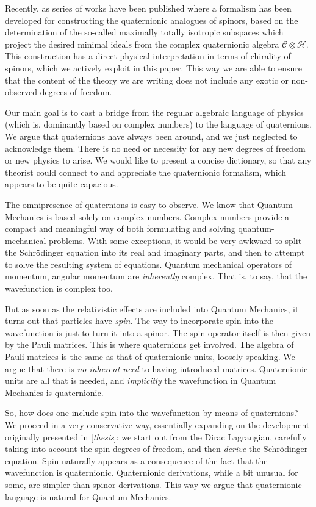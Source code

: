 \documentclass[epsfig,12pt]{article}
\newcommand{\cC}{\mathcal{C}}
\newcommand{\cH}{\mathcal{H}}
\begin{document}
	Recently, as series of works have been published where a formalism has been developed for constructing
	the quaternionic analogues of spinors, based on the determination of the so-called
	maximally totally isotropic subspaces which project the desired minimal ideals from the
	complex quaternionic algebra $ \cC \otimes \cH $.
	This construction has a direct physical interpretation in terms of chirality of spinors,
	which we actively exploit in this paper.
	This way we are able to ensure that the content of the theory we are writing does not
	include any exotic or non-observed degrees of freedom.

	Our main goal is to cast a bridge from the regular algebraic language of physics (which is, dominantly based
	on complex numbers) to the language of quaternions.
	We argue that quaternions have always been around, and we just neglected to acknowledge them.
	There is no need or necessity for any new degrees of freedom or new physics to arise.
	We would like to present a concise dictionary, so that any theorist could connect to and appreciate
	the quaternionic formalism, which appears to be quite capacious.

	The omnipresence of quaternions is easy to observe.
	We know that Quantum Mechanics is based solely on complex numbers.
	Complex numbers provide a compact and meaningful way of both formulating and solving quantum-mechanical problems.
	With some exceptions, it would be very awkward to split the Schr\"odinger equation into its real and imaginary parts,
	and then to attempt to solve the resulting system of equations.
	Quantum mechanical operators of momentum, angular momentum are \emph{inherently} complex.
	That is, to say, that the wavefunction is complex too.
	
	But as soon as the relativistic effects are included into Quantum Mechanics, it turns out that particles
	have \emph{spin}.
	The way to incorporate spin into the wavefunction is just to turn it into a spinor.
	The spin operator itself is then given by the Pauli matrices.
	This is where quaternions get involved.
	The algebra of Pauli matrices is the same as that of quaternionic units, loosely speaking.
	We argue that there is \emph{no inherent need} to having introduced matrices.
	Quaternionic units are all that is needed, and \emph{implicitly} the wavefunction in Quantum Mechanics is quaternionic.

	So, how does one include spin into the wavefunction by means of quaternions?
	We proceed in a very conservative way, essentially expanding on the development originally presented in [{\it thesis}]:
	we start out from the Dirac Lagrangian, carefully taking into account the spin degrees of freedom,
	and then \emph{derive} the Schr\"odinger equation.
	Spin naturally appears as a consequence of the fact that the wavefunction is quaternionic.
	Quaternionic derivations, while a bit unusual for some, are simpler than spinor derivations.
	This way we argue that quaternionic language is natural for Quantum Mechanics.
\end{document}
